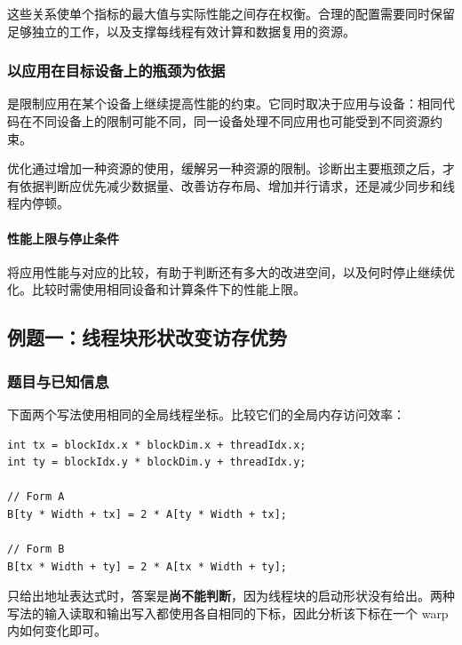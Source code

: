 这些关系使单个指标的最大值与实际性能之间存在权衡。合理的配置需要同时保留足够独立的工作，以及支撑每线程有效计算和数据复用的资源。

\subsubsection{以应用在目标设备上的瓶颈为依据}
是限制应用在某个设备上继续提高性能的约束。它同时取决于应用与设备：相同代码在不同设备上的限制可能不同，同一设备处理不同应用也可能受到不同资源约束。

优化通过增加一种资源的使用，缓解另一种资源的限制。诊断出主要瓶颈之后，才有依据判断应优先减少数据量、改善访存布局、增加并行请求，还是减少同步和线程内停顿。

\paragraph{性能上限与停止条件}
将应用性能与对应的比较，有助于判断还有多大的改进空间，以及何时停止继续优化。比较时需使用相同设备和计算条件下的性能上限。
\FloatBarrier

\Needspace{0.6\textheight}
\subsection{例题一：线程块形状改变访存优势}
\subsubsection{题目与已知信息}
\par\noindent\begin{minipage}{\linewidth}
下面两个写法使用相同的全局线程坐标。比较它们的全局内存访问效率：

\begin{lstlisting}[caption={两种行列下标映射。A、B 表示数组名；注释中的 A/B 表示待比较的两种写法。}]
int tx = blockIdx.x * blockDim.x + threadIdx.x;
int ty = blockIdx.y * blockDim.y + threadIdx.y;

// Form A
B[ty * Width + tx] = 2 * A[ty * Width + tx];

// Form B
B[tx * Width + ty] = 2 * A[tx * Width + ty];
\end{lstlisting}
\end{minipage}\par

只给出地址表达式时，答案是\textbf{尚不能判断}，因为线程块的启动形状没有给出。两种写法的输入读取和输出写入都使用各自相同的下标，因此分析该下标在一个 warp 内如何变化即可。

